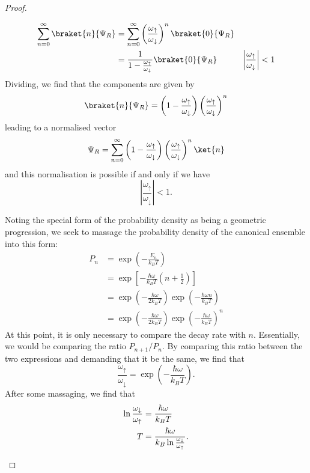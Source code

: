 \begin{proof}
\begin{parts}
		\begin{align*}
			\sum_{n=0}^{\infty} \braket{n}{\Psi_R} &= \sum_{n=0}^{\infty} \left( \frac{\omega_\uparrow}{\omega_\downarrow} \right)^n \braket{0}{\Psi_R} \\
							     &= \frac{1}{1- \frac{\omega_\uparrow}{\omega_\downarrow}}\braket{0}{\Psi_R} & \left| \frac{\omega_\uparrow}{\omega_\downarrow} \right|<1 
		\end{align*}
		Dividing, we find that the components are given by
		\[
			\braket{n}{\Psi_R} = \left( 1- \frac{\omega_\uparrow}{\omega_\downarrow} \right)\left( \frac{\omega_\uparrow}{\omega_\downarrow} \right)^n
		\]
		leading to a normalised vector
		\[\Psi_R = \sum_{n=0}^\infty \left( 1- \frac{\omega_\uparrow}{\omega_\downarrow} \right)\left( \frac{\omega_\uparrow}{\omega_\downarrow} \right)^n\ket{n}\]
		and this normalisation is possible if and only if we have
		\[
		\left| \frac{\omega_\uparrow}{\omega_\downarrow} \right| <1
		.\] 
	\item Noting the special form of the probability density as being a geometric progression, we seek to massage the probability density of the canonical ensemble into this form:
		\begin{align*}
			P_n &= \exp\left( - \frac{E_n}{k_B T} \right)  \\
			    &= \exp\left[ -\frac{\hbar\omega}{k_B T}\left( n+\frac{1}{2} \right)  \right]  \\
			    &= \exp\left(- \frac{\hbar\omega}{2k_B T} \right) \exp\left( -\frac{\hbar\omega n}{k_B T}  \right)  \\
			    &= \exp\left(- \frac{\hbar\omega}{2k_B T} \right) \exp\left( -\frac{\hbar\omega }{k_B T}  \right)^n  
		\end{align*}
		At this point, it is only necessary to compare the decay rate with $n$. Essentially, we would be comparing the ratio $P_{n+1} / P_n$. By comparing this ratio between the two expressions and demanding that it be the same, we find that
		\[
		\frac{\omega_\uparrow}{\omega_\downarrow}= \exp\left( -\frac{\hbar\omega}{k_B T} \right) 
		.\] 
		After some massaging, we find that
		\begin{align*}
			\ln \frac{\omega_\downarrow}{\omega_\uparrow}&= \frac{\hbar\omega}{k_B T}\\	
T &= \frac{\hbar\omega}{k_B \ln \frac{\omega_\downarrow}{\omega_\uparrow}}.\qedhere	
		\end{align*}
	\end{parts}
\end{proof}
